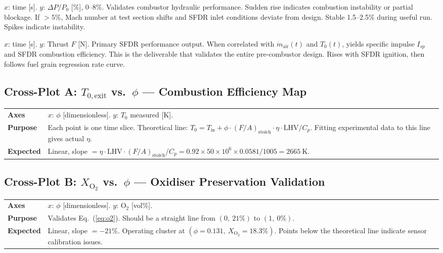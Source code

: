 \documentclass[12pt,a4paper]{report}
\begin{document}
  {$x$: time [s]. \quad $y$: $\Delta P/P_0$ [\%], 0--8\%.}
  {Validates combustor hydraulic performance. Sudden rise indicates combustion
   instability or partial blockage. If $>5\%$, Mach number at test section shifts
   and SFDR inlet conditions deviate from design.}
  {Stable 1.5--2.5\% during useful run. Spikes indicate instability.}

  {$x$: time [s]. \quad $y$: Thrust $F$ [N].}
  {Primary SFDR performance output. When correlated with $\dot{m}_\text{air}(t)$
   and $T_0(t)$, yields specific impulse $I_{sp}$ and SFDR combustion efficiency.
   This is the deliverable that validates the entire pre-combustor design.}
  {Rises with SFDR ignition, then follows fuel grain regression rate curve.}

\subsection*{Cross-Plot A: $T_{0,\text{exit}}$ vs.\ $\phi$ — Combustion Efficiency Map}
\begin{center}
\renewcommand{\arraystretch}{1.3}
\begin{tabularx}{\linewidth}{@{}lX@{}}
  \toprule
  \textbf{Axes}     & $x$: $\phi$ [dimensionless]. \quad $y$: $T_0$ measured [K].\\
  \textbf{Purpose}  & Each point is one time slice. Theoretical line:
    $T_0 = T_\text{in} + \phi\cdot(F/A)_\text{stoich}\cdot\eta\cdot\text{LHV}/C_p$.
    Fitting experimental data to this line gives actual $\eta$.\\
  \textbf{Expected} & Linear, slope $= \eta\cdot\text{LHV}\cdot(F/A)_\text{stoich}/C_p
    = 0.92\times50\times10^6\times0.0581/1005 = 2665\ \text{K}$.\\
  \bottomrule
\end{tabularx}
\end{center}

\subsection*{Cross-Plot B: $X_{\text{O}_2}$ vs.\ $\phi$ — Oxidiser Preservation Validation}
\begin{center}
\renewcommand{\arraystretch}{1.3}
\begin{tabularx}{\linewidth}{@{}lX@{}}
  \toprule
  \textbf{Axes}     & $x$: $\phi$ [dimensionless]. \quad $y$: O$_2$ [vol\%].\\
  \textbf{Purpose}  & Validates Eq.~(\ref{eq:o2}). Should be a straight line from
    $(0,\ 21\%)$ to $(1,\ 0\%)$.\\
  \textbf{Expected} & Linear, slope $= -21\%$.
    Operating cluster at $(\phi=0.131,\ X_{\text{O}_2}=18.3\%)$.
    Points below the theoretical line indicate sensor calibration issues.\\
  \bottomrule
\end{tabularx}
\end{center}
\end{document}
